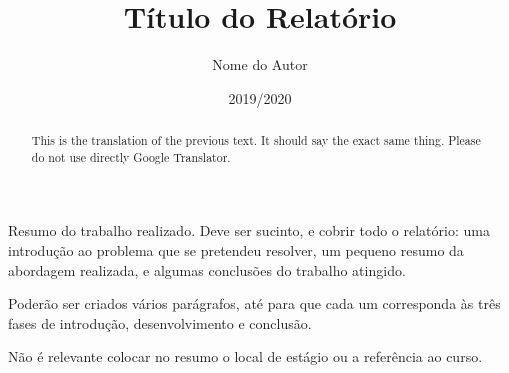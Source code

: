 \documentclass[a4paper,12pt,twoside]{book}
\title{Título do Relatório}
\author{Nome do Autor}
\date{2019/2020}
\begin{document}
\frontmatter
\maketitle  %


\begin{resumo}
Resumo do trabalho realizado. Deve ser sucinto, e cobrir todo o relatório: uma introdução ao problema que se pretendeu resolver, um pequeno resumo da abordagem realizada, e algumas conclusões do trabalho atingido.

Poderão ser criados vários parágrafos, até para que cada um corresponda às três fases de introdução, desenvolvimento e conclusão.

Não é relevante colocar no resumo o local de estágio ou a referência ao curso. 
\end{resumo}

\begin{abstract}
This is the translation of the previous text. It should say the exact same thing. Please do not use directly Google Translator.
\end{abstract}

\begin{agradecimentos}
\end{agradecimentos}


\tableofcontents

\listoffigures

\listoftables

\lstlistoflistings


\printglossary[type=\acronymtype,title={Siglas \& Acrónimos}]


\printglossary


\printglossary


\mainmatter








\end{document}
